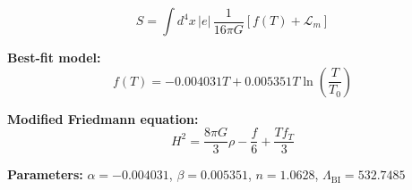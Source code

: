 
\begin{equation}
  S = \int d^4x \, |e| \, \frac{1}{16\pi G} \left[ f(T) + \mathcal{L}_m \right]
\end{equation}

\textbf{Best-fit model:}
\begin{equation}
  f(T) = -0.004031 T + 0.005351 T \ln\!\left(\frac{T}{T_0}\right)
\end{equation}

\textbf{Modified Friedmann equation:}
\begin{equation}
  H^2 = \frac{8\pi G}{3} \rho - \frac{f}{6} + \frac{T f_T}{3}
\end{equation}

\textbf{Parameters:}
$\alpha = -0.004031$, \quad
$\beta = 0.005351$, \quad
$n = 1.0628$, \quad
$\Lambda_{\text{BI}} = 532.7485$